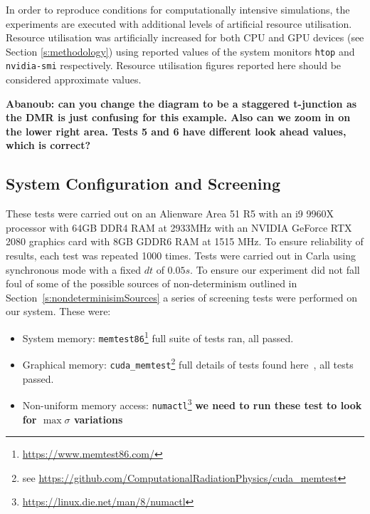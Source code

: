 \documentclass[letterpaper, 10 pt, journal, twoside]{IEEEtran}
\begin{document}
In order to reproduce conditions for computationally intensive simulations, the experiments are executed with additional levels of artificial resource utilisation. Resource utilisation was artificially increased for both CPU and GPU devices (see Section \ref{s:methodology}) using reported values of the system monitors \texttt{htop} and \texttt{nvidia-smi} respectively. Resource utilisation figures reported here should be considered approximate values.

\textbf{Abanoub: can you change the diagram to be a staggered t-junction as the DMR is just confusing for this example. Also can we zoom in on the lower right area. Tests 5 and 6 have different look ahead values, which is correct?}

\subsection{System Configuration and Screening}
These tests were carried out on an Alienware Area 51 R5 with an i9 9960X processor with 64GB DDR4 RAM at 2933MHz with an NVIDIA GeForce RTX 2080 graphics card with 8GB GDDR6 RAM at 1515 MHz. To ensure reliability of results, each test was repeated 1000 times. Tests were carried out in Carla using synchronous mode with a fixed $dt$ of $0.05s$. To ensure our experiment did not fall foul of some of the possible sources of non-determinism outlined in Section~\ref{s:nondeterminisimSources} a series of screening tests were performed on our system. These were:

\begin{itemize}[leftmargin=*]
    \item System memory: \texttt{memtest86}\footnote{\url{https://www.memtest86.com/}} full suite of tests ran, all passed.
    \item Graphical memory: \texttt{cuda\_memtest}\footnote{see \url{https://github.com/ComputationalRadiationPhysics/cuda_memtest}} full details of tests found here~\cite{shi2009testing}, all tests passed.
    \item Non-uniform memory access: \texttt{numactl}\footnote{\url{https://linux.die.net/man/8/numactl}} \textbf{we need to run these test to look for $\max\sigma$ variations}
\end{itemize}
\end{document}
